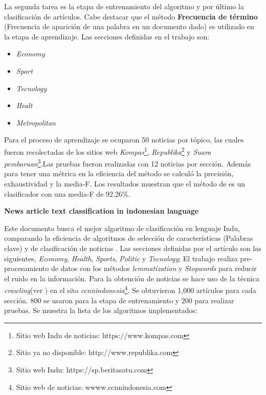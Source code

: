 La segunda tarea es la etapa de entrenamiento del algoritmo y por último la clasificación de artículos. Cabe destacar que el método \textbf{Frecuencia de término} (Frecuencia de aparición de una palabra en un documento dado) es utilizado en la etapa de aprendizaje. Las secciones definidas en el trabajo son: 

\begin{itemize}

	\item \textit{Economy}
	\item \textit{Sport}
	\item \textit{Tecnology}
	\item \textit{Healt} 
	\item \textit{Metropolitan}

\end{itemize}

Para el proceso de aprendizaje se ocuparon 50 noticias por tópico, las cuales fueron recolectadas de los sitios web \textit{Kompas}\footnote{Sitio web Indu de noticias: https://www.kompas.com}, \textit{Republika}\footnote{Sitio ya no disponible: http://www.republika.com} y \textit{Suara pembaruan}\footnote{Sitio web Indu: https://sp.beritasatu.com}.Las pruebas fueron realizadas con 12 noticias por sección. Además para tener una métrica en la eficiencia del método se calculó la precisión, exhaustividad y la media-F. Los resultados muestran que el método de  es un clasificador con una media-F de 92.26\%.\\ 


\begin{large}
	 \textbf{News article text classification in indonesian language}
	 \\
\end{large}

Este documento busca el mejor algoritmo de clasificación en lenguaje Indu, comparando la eficiencia de algoritmos de selección de características (Palabras clave) y de clasificación de noticias \citep{CD8}. Las secciones definidas por el artículo son las siguientes, \textit{Economy}, \textit{Health}, \textit{Sports}, \textit{Politic} y \textit{Tecnology}; El trabajo realiza pre-procesamiento de datos con  los métodos \textit{lemmatization} y \textit{Stopwords} para reducir el ruido en la información. Para la obtención de noticias se hace uso de la técnica \textit{crawling}(ver ) en el sito \textit{ccnnindonesia}\footnote{Sitio web de noticias: wwww.ccnnindonesia.com}. Se obtuvieron 1,000 artículos para cada sección. 800 se usaron para la etapa de entrenamiento y 200 para realizar pruebas. Se muestra la lista de los algoritmos implementados:

